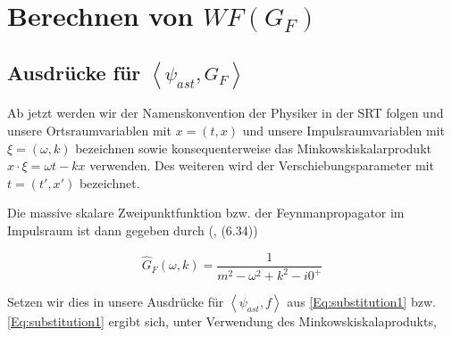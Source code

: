 \section{\texorpdfstring{Berechnen von $WF(G_F)$}
        {Berechnen von WF(Gf)}} %
\label{sec:berechnen_von_}

\subsection{\texorpdfstring{Ausdrücke für $\left< \psi_{ast}, G_F\right>$}
        {Ausdrücke für psi ast, gf}} %
\label{sec:psiast_gf}


Ab jetzt werden wir der Namenskonvention der Physiker in der SRT folgen und unsere
Ortsraumvariablen mit $x = (t, x)$ und unsere Impulsraumvariablen mit $\xi = (\omega, k)$
bezeichnen sowie konsequenterweise das Minkowskiskalarprodukt $x \cdot \xi = \omega t - k x$
verwenden. Des weiteren wird der Verschiebungsparameter mit  $t = (t', x')$ bezeichnet.

Die massive skalare Zweipunktfunktion bzw. der Feynmanpropagator im Impulsraum ist dann gegeben durch (\textcite{Schwartz2014}, (6.34))

\begin{equation}
\label{eq:gf}
    \hat G_F(\omega, k) = \frac{1}{m^2 - \omega^2 + k^2 - i 0^+}
\end{equation}

Setzen wir dies in unsere Ausdrücke für $\left< \psi_{ast}, f\right>$ aus \eqref{Eq:substitution1}
bzw. \eqref{Eq:substitution1} ergibt sich, unter Verwendung des Minkowskiskalaprodukts,


